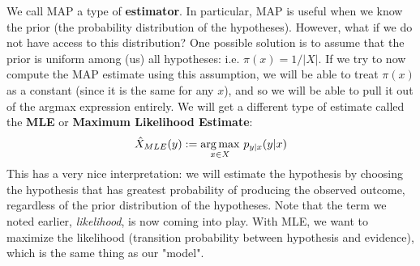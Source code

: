 We call MAP a type of \textbf{estimator}. In particular, MAP is useful when we know the prior (the probability distribution of the hypotheses). However, what if we do not have access to this distribution? One possible solution is to assume that the prior is uniform among (us) all hypotheses: i.e. \(\pi(x) = 1/|X|\). If we try to now compute the MAP estimate using this assumption, we will be able to treat \(\pi(x)\) as a constant (since it is the same for any \(x\)), and so we will be able to pull it out of the argmax expression entirely. We will get a different type of estimate called the \textbf{MLE} or \textbf{Maximum Likelihood Estimate}:
\begin{equation*}
  \MLE (y) := \underset{x \in X}{\argmax}\ p_{y|x}(y|x)
\end{equation*}
This has a very nice interpretation: we will estimate the hypothesis by choosing the hypothesis that has greatest probability of producing the observed outcome, regardless of the prior distribution of the hypotheses. Note that the term we noted earlier, \textit{likelihood}, is now coming into play. With MLE, we want to maximize the likelihood (transition probability between hypothesis and evidence), which is the same thing as our "model".

\subsection{}




